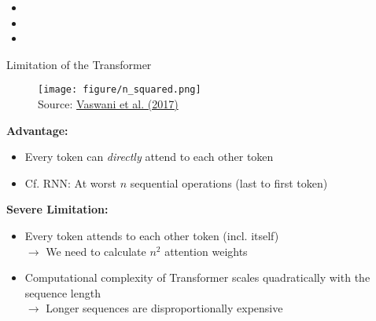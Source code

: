 \begin{vbframe}{}

\vfill

\textbf{}

	\begin{itemize}
		\item 
		\item 
		\item 
	\end{itemize}

\vfill

\end{vbframe}









\begin{vbframe}{Limitation of the Transformer}

\vfill

\begin{figure}
\centering
\texttt{[image: figure/n\_squared.png]}\\ 
\footnotesize{Source:} \href{https://arxiv.org/pdf/1706.03762.pdf}{\footnotesize Vaswani et al. (2017)}
\end{figure}

\textbf{Advantage:}

\begin{itemize}
	\item Every token can \textit{directly} attend to each other token
	\item Cf. RNN: At worst $n$ sequential operations (last to first token)
\end{itemize}

\textbf{Severe Limitation:}

\begin{itemize}
	\item Every token attends to each other token (incl. itself)\\
				$\to$ We need to calculate $n^2$ attention weights
	\item Computational complexity of Transformer scales quadratically with the sequence length\\
				$\to$ Longer sequences are disproportionally expensive
\end{itemize}

\vfill

\end{vbframe}
